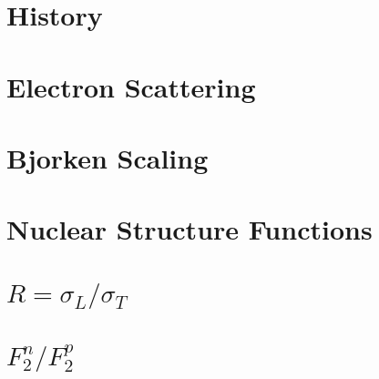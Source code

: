 
\section{History}


\section{Electron Scattering}


\section{Bjorken Scaling}


\section{Nuclear Structure Functions}


\section{$R=\sigma_L/\sigma_T$}


\section{$F_2^n/F_2^p$}


%


